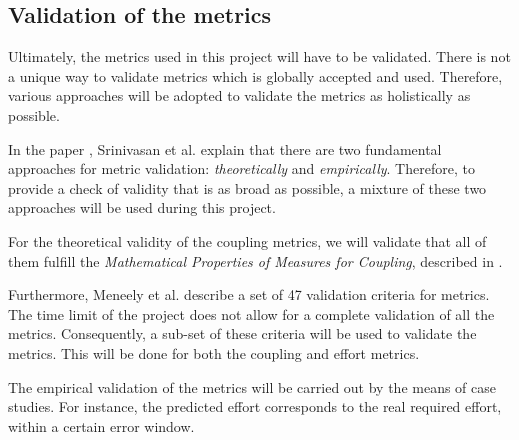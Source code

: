 \subsection{Validation of the metrics}
Ultimately, the metrics used in this project will have to be validated. There is not a unique way to validate metrics which is globally accepted and used. Therefore, various approaches will be adopted to validate the metrics as holistically as possible.

In the paper \cite{srinivasan2014software}, Srinivasan et al. explain that there are two fundamental approaches for metric validation: \textit{theoretically} and \textit{empirically}. Therefore, to provide a check of validity that is as broad as possible, a mixture of these two approaches will be used during this project.

For the theoretical validity of the coupling metrics, we will validate that all of them fulfill the \textit{Mathematical Properties of Measures for Coupling}, described in \cite{srinivasan2014software}.

Furthermore, Meneely et al. \cite{meneely2013validating} describe a set of 47 validation criteria for metrics. The time limit of the project does not allow for a complete validation of all the metrics. Consequently, a sub-set of these criteria will be used to validate the metrics. This will be done for both the coupling and effort metrics.

The empirical validation of the metrics will be carried out by the means of case studies. For instance, the predicted effort corresponds to the real required effort, within a certain error window.
